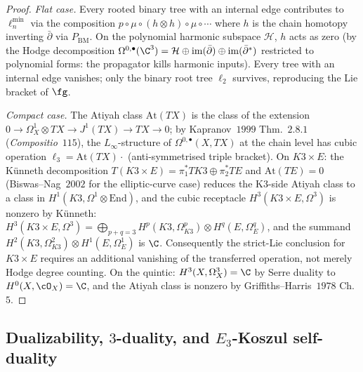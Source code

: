 \begin{proof}
\emph{Flat case.}
Every rooted binary tree with an internal edge contributes to
$\ell_n^{\min}$ via the composition
$p \circ \mu \circ (h \otimes h) \circ \mu \circ \cdots$
where $h$ is the chain homotopy inverting $\bar\partial$ via
$P_{\mathrm{BM}}$. On the polynomial harmonic subspace $\mathcal{H}$,
$h$ acts as zero (by the Hodge decomposition
$\Omega^{0,\bullet}(\C^3) = \mathcal{H} \oplus \mathrm{im}(\bar\partial)
\oplus \mathrm{im}(\bar\partial^*)$
restricted to polynomial forms: the propagator kills harmonic inputs).
Every tree with an internal edge vanishes; only the binary root tree
$\ell_2$ survives, reproducing the Lie bracket of $\fg$.

\emph{Compact case.}
The Atiyah class $\mathrm{At}(TX)$ is the class of the extension
$0 \to \Omega^1_X \otimes TX \to J^1(TX) \to TX \to 0$; by
Kapranov~$1999$ Thm.~$2.8.1$ (\emph{Compositio}~$115$), the
$L_\infty$-structure of $\Omega^{0,\bullet}(X, TX)$ at the chain level
has cubic operation $\ell_3 = \mathrm{At}(TX) \cdot$ (anti-symmetrised
triple bracket). On $K3 \times E$: the K\"unneth decomposition
$T(K3 \times E) = \pi_1^* TK3 \oplus \pi_2^* TE$ and
$\mathrm{At}(TE) = 0$ (Biswas--Nag~$2002$ for the elliptic-curve case)
reduces the K3-side Atiyah class to a class in
$H^1(K3, \Omega^1 \otimes \mathrm{End})$, and the cubic receptacle
 $H^3(K3 \times E, \Omega^3)$ is nonzero by K\"unneth:
 $H^3(K3 \times E, \Omega^3) = \bigoplus_{p+q=3}
 H^p(K3, \Omega^p_{K3}) \otimes H^q(E, \Omega^q_E)$, and the summand
 $H^2(K3,\Omega^2_{K3})\otimes H^1(E,\Omega^1_E)$ is $\C$.
 Consequently the strict-Lie conclusion for $K3\times E$ requires an
 additional vanishing of the transferred operation, not merely Hodge
 degree counting.
On the quintic: $H^3(X, \Omega^3_X) = \C$ by Serre duality to
$H^0(X, \cO_X) = \C$, and the Atiyah class is nonzero by
Griffiths--Harris~$1978$ Ch.~$5$.
\end{proof}

\subsection{Dualizability, \texorpdfstring{$3$}{3}-duality, and \texorpdfstring{$E_3$}{E-3}-Koszul self-duality}
\label{subsec:hcs-dualizability}

